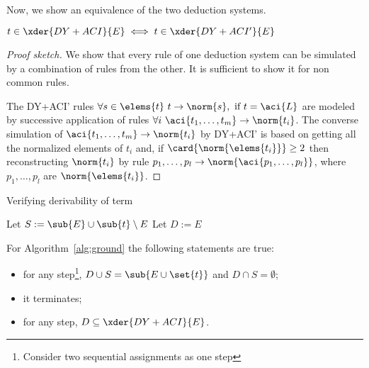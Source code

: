 Now, we show an equivalence of the two deduction systems.
 
\begin{lemma}
	$t\in\xder{DY+ACI}{E} \iff t\in\xder{DY+ACI'}{E}$
\begin{proof}[Proof sketch] 

We show that every   rule of one deduction system can be simulated by a combination 
of rules from the other. It is sufficient to show it for non common rules. 

The DY+ACI' rules
	$\forall s\in\elems{t} \ {t} \rightarrow \norm{s}, \mbox{ if }  t=\aci{L}$ 
	are modeled by successive application of rules
	$\forall i  \  \aci{{t_1, \dots, t_m}} \rightarrow \norm{t_i}$.
	The converse simulation of $ \aci{{t_1, \dots, t_m}} \rightarrow \norm{t_i}$ by DY+ACI'
is based on getting all the normalized elements of $t_i$ 
	and, if $\card{\norm{\elems{t_i}}} \geq 2$ then reconstructing $\norm{t_i}$ by rule ${p_1,\dots, p_l} \rightarrow \norm{\aci{p_1, \dots, p_l}}$,
	where $p_1, \dots, p_l$ are $\norm{\elems{t_i}}$.
\end{proof}

\end{lemma}

\begin{algorithm}[H]
  \caption{Verifying derivability of term}
  \label{alg:ground}
  \BlankLine
Let  $S:=\sub{E}\cup\sub{t}\setminus E$\;
Let $D:=E$\;
\end{algorithm}


\begin{lemma}\label{lemma:propalgo}
	For Algorithm~\ref{alg:ground} the following statements are true:
	\begin{itemize}
		\item for any step\footnote{Consider two sequential assignments as one step}, $D\cup S =\sub{E\cup\set{t}}$ and $D\cap S=\emptyset$;
		\item it terminates;
		\item for any step, $D\subseteq \xder{DY+ACI}{E}$.
	\end{itemize}

\end{lemma}

